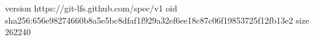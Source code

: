 version https://git-lfs.github.com/spec/v1
oid sha256:656e98274660b8a5e5bc8dfaf1f929a32ef6ee18c87c06f19853725f12fb13e2
size 262240
